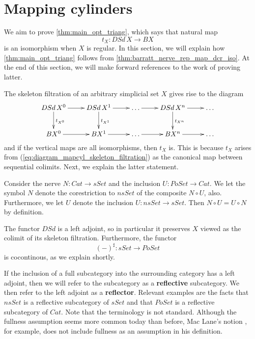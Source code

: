 
\section{Mapping cylinders}
\label{sec:mapcyl}


We aim to prove \cref{thm:main_opt_triang}, which says that natural map
\[t_X:DSd\, X\to BX\]
is an isomorphism when $X$ is regular. In this section, we will explain how \cref{thm:main_opt_triang} follows from \cref{thm:barratt_nerve_rep_map_dcr_iso}. At the end of this section, we will make forward references to the work of proving latter.

The skeleton filtration of an arbitrary simplicial set $X$ gives rise to the diagram
\begin{equation}
\label{eq:diagram_mapcyl_skeleton_filtration}
\begin{gathered}
\xymatrix{
DSd\, X^0 \ar[d]^{t_{X^0}} \ar[r] & DSd\, X^1 \ar[d]^{t_{X^1}} \ar[r] & \dots \ar[r] & DSd\, X^n \ar[d]^{t_{X^n}} \ar[r] & \dots \\
BX^0 \ar[r] & BX^1 \ar[r] & \dots \ar[r] & BX^n \ar[r] & \dots
}
\end{gathered}
\end{equation}
and if the vertical maps are all isomorphisms, then $t_X$ is. This is because $t_X$ arises from (\ref{eq:diagram_mapcyl_skeleton_filtration}) as the canonical map between sequential colimits. Next, we explain the latter statement.

Consider the nerve $N:Cat\to sSet$ and the inclusion $U:PoSet\to Cat$. We let the symbol $N$ denote the corestriction to $nsSet$ of the composite $N\circ U$, also. Furthermore, we let $U$ denote the inclusion $U:nsSet\to sSet$. Then $N\circ U=U\circ N$ by definition.

The functor $DSd$ is a left adjoint, so in particular it preserves $X$ viewed as the colimit of its skeleton filtration. Furthermore, the functor
\[(-)^\sharp :sSet\to PoSet\]
is cocontinous, as we explain shortly.

If the inclusion of a full subcategory into the surrounding category has a left adjoint, then we will refer to the subcategory as a \textbf{reflective} subcategory. We then refer to the left adjoint as a \textbf{reflector}. Relevant examples are the facts that $nsSet$ is a reflective subcategory of $sSet$ and that $PoSet$ is a reflective subcategory of $Cat$. Note that the terminology is not standard. Although the fullness assumption seems more common today than before, Mac Lane's notion \cite{ML98}, for example, does not include fullness as an assumption in his definition.

